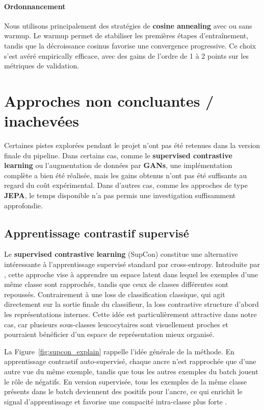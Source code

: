 \documentclass[journal,twocolumn]{IEEEtran}
\begin{document}
\paragraph{Ordonnancement}

Nous utilisons principalement des stratégies de \textbf{cosine annealing} avec ou sans warmup. Le warmup permet de stabiliser les premières étapes d’entraînement, tandis que la décroissance cosinus favorise une convergence progressive. Ce choix s’est avéré empirically efficace, avec des gains de l’ordre de 1 à 2 points sur les métriques de validation.



\newpage
\section{Approches non concluantes / inachevées}

Certaines pistes explorées pendant le projet n’ont pas été retenues dans la version finale du pipeline. Dans certains cas, comme le \textbf{supervised contrastive learning} ou l’augmentation de données par \textbf{GANs}, une implémentation complète a bien été réalisée, mais les gains obtenus n’ont pas été suffisants au regard du coût expérimental. Dans d’autres cas, comme les approches de type \textbf{JEPA}, le temps disponible n’a pas permis une investigation suffisamment approfondie.

\subsection{Apprentissage contrastif supervisé}

Le \textbf{supervised contrastive learning} (SupCon) constitue une alternative intéressante à l’apprentissage supervisé standard par cross-entropy. Introduite par \cite{khosla2021supervisedcontrastivelearning}, cette approche vise à apprendre un espace latent dans lequel les exemples d’une même classe sont rapprochés, tandis que ceux de classes différentes sont repoussés. Contrairement à une loss de classification classique, qui agit directement sur la sortie finale du classifieur, la loss contrastive structure d’abord les représentations internes. Cette idée est particulièrement attractive dans notre cas, car plusieurs sous-classes leucocytaires sont visuellement proches et pourraient bénéficier d’un espace de représentation mieux organisé.

La Figure~\ref{fig:supcon_explain} rappelle l’idée générale de la méthode. En apprentissage contrastif auto-supervisé, chaque ancre n’est rapprochée que d’une autre vue du même exemple, tandis que tous les autres exemples du batch jouent le rôle de négatifs. En version supervisée, tous les exemples de la même classe présents dans le batch deviennent des positifs pour l’ancre, ce qui enrichit le signal d’apprentissage et favorise une compacité intra-classe plus forte \cite{khosla2021supervisedcontrastivelearning}.
\end{document}
